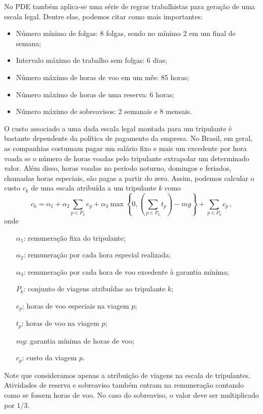 \documentclass[12pt,a4paper]{article}
\newcommand{\ev}{\, ,}                                       %
\begin{document}
No PDE também aplica-se uma série de regras trabalhistas para geração de uma escala legal. Dentre 
elas, podemos citar como mais importantes:

\begin{itemize}
	\item Número mínimo de folgas: 8 folgas, sendo no mínimo 2 em um final de semana;
	\item Intervalo máximo de trabalho sem folgas: 6 dias;
	\item Número máximo de horas de voo em um mês: 85 horas;
	\item Número máximo de horas de uma reserva: 6 horas;
	\item Número máximo de sobreavisos: 2 semanais e 8 mensais.
\end{itemize}

O custo associado a uma dada escala legal montada para um tripulante é bastante dependente da
política de pagamento da empresa. No Brasil, em geral, as companhias costumam pagar um salário fixo
e mais um excedente por hora voada se o número de horas voadas pelo tripulante extrapolar um
determinado valor. Além disso, horas voadas no período noturno, domingos e feriados, chamadas horas
especiais, são pagas a partir do zero. Assim, podemos calcular o custo $c_k$ de uma escala atribuída
a um tripulante $k$ como
%
\begin{equation*}
c_k = \alpha_1 + \alpha_2 \sum_{p \in P_k} e_p 
	+ \alpha_3 \max\left\{0, \left(\sum_{p \in P_k} t_p\right) - mg\right\}
	+ \sum_{p \in P_k} c_p \ev
\end{equation*}
%
onde
%
\begin{itemize}
	\item[$\alpha_1$:] remuneração fixa do tripulante;
	\item[$\alpha_2$:] remuneração por cada hora especial realizada;
	\item[$\alpha_3$:] remuneração por cada hora de voo excedente à garantia mínima;
	\item[$P_k$:] conjunto de viagens atribuídas ao tripulante $k$;	
	\item[$e_p$:] horas de voo especiais na viagem $p$;
	\item[$t_p$:] horas de voo na viagem $p$;
	\item[$mg$:] garantia mínima de horas de voo;
	\item[$c_p$:] custo da viagem $p$.
\end{itemize}
%
Note que consideramos apenas a atribuição de viagens na escala de tripulantes. Atividades de reserva
e sobreaviso também entram na remuneração contando como se fossem horas de voo. No caso do
sobreaviso, o valor deve ser multiplicado por $1/3$.
\end{document}
